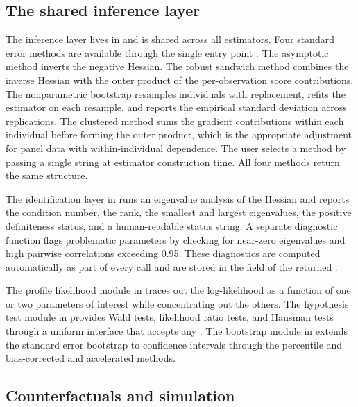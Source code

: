 \subsection{The shared inference layer}

The inference layer lives in  and is shared across all estimators. Four standard error methods are available through the single entry point . The asymptotic method inverts the negative Hessian. The robust sandwich method combines the inverse Hessian with the outer product of the per-observation score contributions. The nonparametric bootstrap resamples individuals with replacement, refits the estimator on each resample, and reports the empirical standard deviation across replications. The clustered method sums the gradient contributions within each individual before forming the outer product, which is the appropriate adjustment for panel data with within-individual dependence. The user selects a method by passing a single string at estimator construction time. All four methods return the same  structure.

The identification layer in  runs an eigenvalue analysis of the Hessian and reports the condition number, the rank, the smallest and largest eigenvalues, the positive definiteness status, and a human-readable status string. A separate diagnostic function  flags problematic parameters by checking for near-zero eigenvalues and high pairwise correlations exceeding 0.95. These diagnostics are computed automatically as part of every  call and are stored in the  field of the returned .

The profile likelihood module in  traces out the log-likelihood as a function of one or two parameters of interest while concentrating out the others. The hypothesis test module in  provides Wald tests, likelihood ratio tests, and Hausman tests through a uniform interface that accepts any . The bootstrap module in  extends the standard error bootstrap to confidence intervals through the percentile and bias-corrected and accelerated methods.

\subsection{Counterfactuals and simulation}

